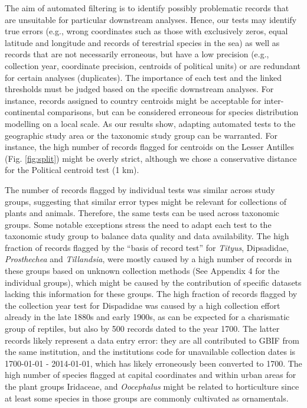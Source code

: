 \documentclass[
  12pt,
]{article}
\begin{document}
The aim of automated filtering is to identify possibly problematic records that are unsuitable for particular downstream analyses. Hence, our tests may identify true errors (e.g., wrong coordinates such as those with exclusively zeros, equal latitude and longitude and records of terestrial species in the sea) as well as records that are not necessarily erroneous, but have a low precision (e.g., collection year, coordinate precision, centroids of political units) or are redundant for certain analyses (duplicates). The importance of each test and the linked thresholds must be judged based on the specific downstream analyses. For instance, records assigned to country centroids might be acceptable for inter-continental comparisons, but can be considered erroneous for species distribution modelling on a local scale. As our results show, adapting automated tests to the geographic study area or the taxonomic study group can be warranted. For instance, the high number of records flagged for centroids on the Lesser Antilles (Fig. \ref{fig:split}) might be overly strict, although we chose a conservative distance for the Political centroid test (1 km).

The number of records flagged by individual tests was similar across study groups, suggesting that similar error types might be relevant for collections of plants and animals. Therefore, the same tests can be used across taxonomic groups. Some notable exceptions stress the need to adapt each test to the taxonomic study group to balance data quality and data availability. The high fraction of records flagged by the ``basis of record test'' for \emph{Tityus}, Dipsadidae, \emph{Prosthechea} and \emph{Tillandsia}, were mostly caused by a high number of records in these groups based on unknown collection methods (See Appendix 4 for the individual groups), which might be caused by the contribution of specific datasets lacking this information for these groups. The high fraction of records flagged by the collection year test for Dispadidae was caused by a high collection effort already in the late 1880s and early 1900s, as can be expected for a charismatic group of reptiles, but also by 500 records dated to the year 1700. The latter records likely represent a data entry error: they are all contributed to GBIF from the same institution, and the institutions code for unavailable collection dates is 1700-01-01 - 2014-01-01, which has likely erroneously been converted to 1700. The high number of species flagged at capital coordinates and within urban areas for the plant groups Iridaceae, and \emph{Oocephalus} might be related to horticulture since at least some species in those groups are commonly cultivated as ornamentals.
\end{document}
